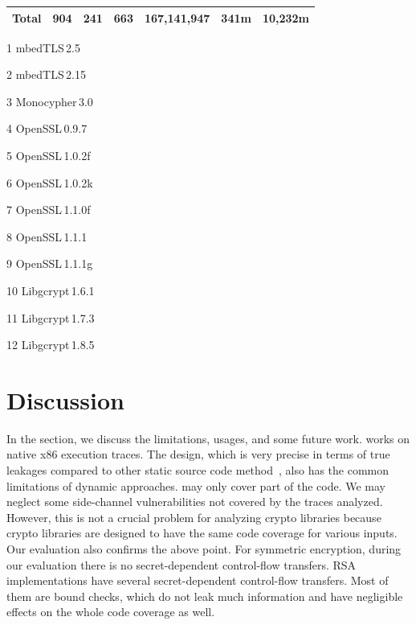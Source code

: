 \begin{table}[]
\begin{threeparttable}
\begin{tabular}{l@{}r@{~~}rrr@{~~}rr}
      Total              & 904                    & 241                 & 663                & 167,141,947      & 341m  & 10,232m     \\\hline
  \end{tabular}
\end{threeparttable}
\begin{tablenotes}
  \scriptsize

  \item[1] mbedTLS\,2.5  ~~~~\item[2] mbedTLS\,2.15 ~\item[3] Monocypher\,3.0 \\
  \item[4] OpenSSL\,0.9.7  ~~\item[5] OpenSSL\,1.0.2f  \item[6] OpenSSL\,1.0.2k \\
  \item[7] OpenSSL\,1.1.0f ~\item[8] OpenSSL\,1.1.1 ~\item[9] OpenSSL\,1.1.1g \\
  \item[10] Libgcrypt\,1.6.1 \item[11] Libgcrypt\,1.7.3 \item[12] Libgcrypt\,1.8.5\\
\end{tablenotes}
\end{table}


\section{Discussion}

In the section, we discuss the limitations, usages, and some future work. 
%
\tool{} works on native x86 execution traces. The design, which is very
precise in terms of true leakages compared to other static source code
method~\cite{197207,BacelarAlmeida:2013:FVS:2483313.2483334}, also has 
the common limitations of dynamic approaches. \tool{} may only cover part of the code.
We may 
neglect some side-channel vulnerabilities not covered by the traces analyzed.
However, this is not a crucial problem for analyzing crypto libraries because crypto
libraries are designed to have the same code coverage for various inputs. Our
evaluation also confirms the above point. For symmetric encryption, during our
evaluation there is no secret-dependent control-flow transfers. RSA
implementations have several secret-dependent control-flow transfers. 
Most of them are  %
bound checks, which do not leak much information and have negligible effects
on the whole code coverage as well.
